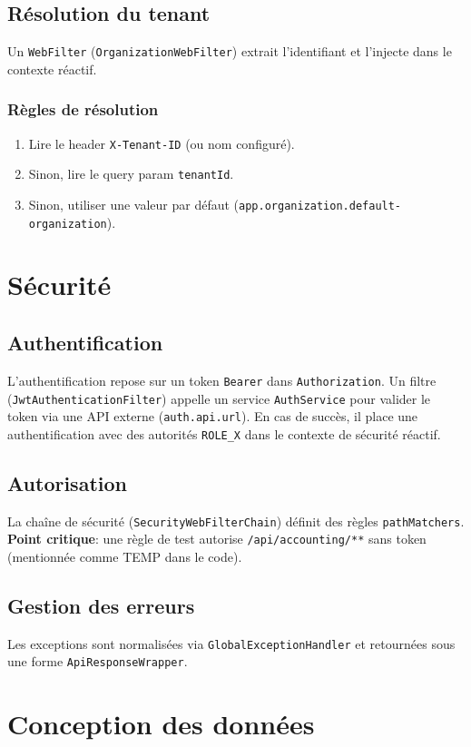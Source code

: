 \documentclass[12pt,a4paper]{report}
\begin{document}
\section{Résolution du tenant}
Un \texttt{WebFilter} (\texttt{OrganizationWebFilter}) extrait l'identifiant et l'injecte dans le contexte réactif.
\subsection{Règles de résolution}
\begin{enumerate}
  \item Lire le header \texttt{X-Tenant-ID} (ou nom configuré).
  \item Sinon, lire le query param \texttt{tenantId}.
  \item Sinon, utiliser une valeur par défaut (\texttt{app.organization.default-organization}).
\end{enumerate}

\chapter{Sécurité}
\section{Authentification}
L'authentification repose sur un token \texttt{Bearer} dans \texttt{Authorization}. Un filtre (\texttt{JwtAuthenticationFilter}) appelle un service \texttt{AuthService} pour valider le token via une API externe (\texttt{auth.api.url}).
En cas de succès, il place une authentification avec des autorités \texttt{ROLE\_X} dans le contexte de sécurité réactif.

\section{Autorisation}
La chaîne de sécurité (\texttt{SecurityWebFilterChain}) définit des règles \texttt{pathMatchers}.
\textbf{Point critique}: une règle de test autorise \texttt{/api/accounting/**} sans token (mentionnée comme TEMP dans le code).

\section{Gestion des erreurs}
Les exceptions sont normalisées via \texttt{GlobalExceptionHandler} et retournées sous une forme \texttt{ApiResponseWrapper}.

\chapter{Conception des données}
\end{document}
